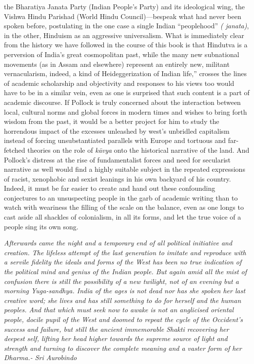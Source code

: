 the Bharatiya Janata Party (Indian People’s Party) and its ideological wing, the Vishwa Hindu Parishad (World Hindu Council)—bespeak what had never been spoken before, postulating in the one case a single Indian “peoplehood” \textit{( janata)}, in the other, Hinduism as an aggressive universalism. What is immediately clear from the history we have followed in the course of this book is that Hindutva is a perversion of India’s great cosmopolitan past, while the many new subnational movements (as in Assam and elsewhere) represent an entirely new, militant vernacularism, indeed, a kind of Heideggerization of Indian life,” crosses the lines of academic scholarship and objectivity and responses to his views too would have to be in a similar vein, even as one is surprised that such content is a part of academic discourse. If Pollock is truly concerned about the interaction between local, cultural norms and global forces in modern times and wishes to bring forth wisdom from the past, it would be a better project for him to study the horrendous impact of the excesses unleashed by west’s unbridled capitalism instead of forcing unsubstantiated parallels with Europe and tortuous and far-fetched theories on the role of \textit{kāvya} onto the historical narrative of the land. And Pollock’s distress at the rise of fundamentalist forces and need for secularist narrative as well would find a highly suitable subject in the repeated expressions of racist, xenophobic and sexist leanings in his own backyard of his country. Indeed, it must be far easier to create and hand out these confounding conjectures to an unsuspecting people in the garb of academic writing than to watch with weariness the filling of the scale on the balance, even as one longs to cast aside all shackles of colonialism, in all its forms, and let the true voice of a people sing its own song.

\begin{myquote}
\textit{Afterwards came the night and a temporary end of all political initiative and creation. The lifeless attempt of the last generation to imitate and reproduce with a servile fidelity the ideals and forms of the West has been no true indication of the political mind and genius of the Indian people. But again amid all the mist of confusion there is still the possibility of a new twilight, not of an evening but a morning Yuga-sandhya. India of the ages is not dead nor has she spoken her last creative word; she lives and has still something to do for herself and the human peoples. And that which must seek now to awake is not an anglicised oriental people, docile pupil of the West and doomed to repeat the cycle of the Occident’s success and failure, but still the ancient immemorable Shakti recovering her deepest self, lifting her head higher towards the supreme source of light and strength and turning to discover the complete meaning and a vaster form of her Dharma.}\hfill \textit{- Sri Aurobindo}
\end{myquote}

